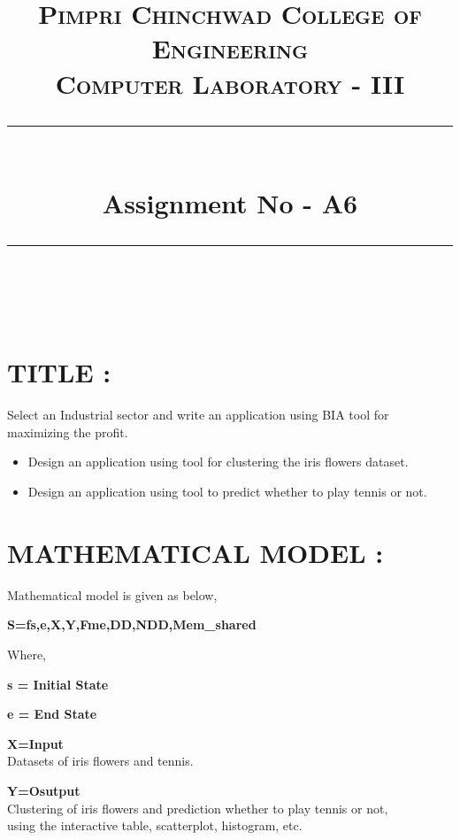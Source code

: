 \documentclass[a4paper,12pt]{article}
\title{
	\normalfont \normalsize 
	\textsc{Pimpri Chinchwad College of Engineering \\ 
		Computer Laboratory - III} \\
	[10pt] 
	\rule{\linewidth}{0.5pt} \\[6pt] 
	\huge Assignment No - A6 \\
	\rule{\linewidth}{2pt}  \\[10pt]
}
\author{}
\date{\normalsize}
\begin{document}
	\maketitle
	
\section{TITLE : }   Select an Industrial sector and write an application using BIA tool for maximizing the profit.

\begin{itemize}
	\item Design an application using tool for clustering the iris flowers dataset.
	\item Design an application using tool to predict whether to play tennis or not.
	
\end{itemize}

\section{MATHEMATICAL MODEL : }

{\rmfamily
	Mathematical model is given as below,}


\bigskip

\textrm{\textbf{S=fs,e,X,Y,Fme,DD,NDD,Mem\_shared}}


\bigskip

{\rmfamily
	Where,}

{\rmfamily
	\textbf{s = Initial State}}

{\rmfamily
	\textbf{e = End State}}

{\rmfamily
	\textbf{X=Input}\\
	Datasets of iris flowers and tennis.
	}
	
	{\rmfamily
		\textbf{Y=Osutput}\\
		Clustering of iris flowers and prediction whether to play tennis or not, \\using the interactive table, scatterplot, histogram, etc.}
	
\end{document}
